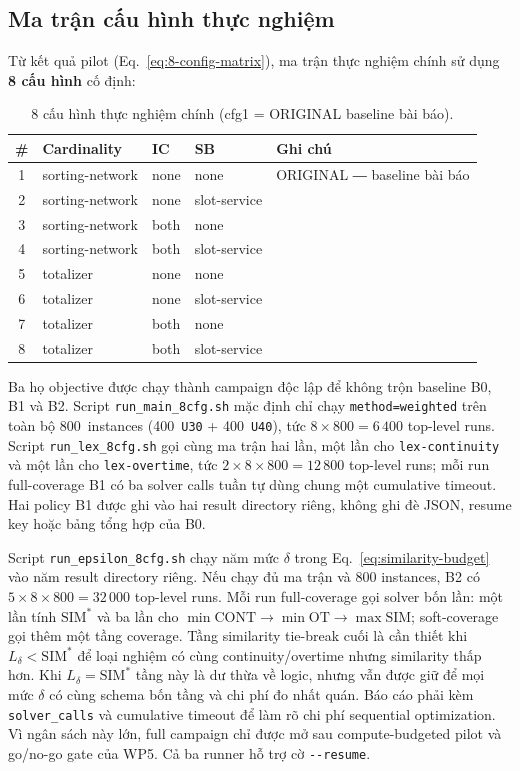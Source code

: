 \documentclass[12pt,a4paper]{article}
\newcommand{\SIM}{\mathrm{SIM}}
\newcommand{\CONT}{\mathrm{CONT}}
\newcommand{\OT}{\mathrm{OT}}
\begin{document}
\subsection{Ma trận cấu hình thực nghiệm}
\label{sec:matrix-cfg}

Từ kết quả pilot (Eq.~\ref{eq:8-config-matrix}), ma trận thực nghiệm chính
sử dụng \textbf{8 cấu hình} cố định:

\begin{table}[H]
\centering
\caption{8 cấu hình thực nghiệm chính (cfg1 = ORIGINAL baseline bài báo).}
\label{tab:8-cfg-main}
\begin{tabularx}{\textwidth}{@{}c>{\ttfamily\raggedright}p{4.2cm}>{\ttfamily}p{2.2cm}>{\ttfamily}p{3.2cm}X@{}}
\toprule
\# & Cardinality & IC & SB & Ghi chú \\
\midrule
1 & sorting-network & none & none & ORIGINAL ― baseline bài báo \\
2 & sorting-network & none & slot-service & \\
3 & sorting-network & both & none & \\
4 & sorting-network & both & slot-service & \\
5 & totalizer & none & none & \\
6 & totalizer & none & slot-service & \\
7 & totalizer & both & none & \\
8 & totalizer & both & slot-service & \\
\bottomrule
\end{tabularx}
\end{table}

Ba họ objective được chạy thành campaign độc lập để không trộn baseline B0,
B1 và B2. Script \texttt{run\_main\_8cfg.sh} mặc định chỉ chạy
\texttt{method=weighted} trên toàn bộ 800~instances
(400~\texttt{U30} + 400~\texttt{U40}), tức $8\times800=6\,400$ top-level
runs. Script \texttt{run\_lex\_8cfg.sh} gọi cùng ma trận hai lần, một lần cho
\texttt{lex-continuity} và một lần cho \texttt{lex-overtime}, tức
$2\times8\times800=12\,800$ top-level runs; mỗi run full-coverage B1 có ba
solver calls tuần tự dùng chung một cumulative timeout. Hai policy B1 được ghi
vào hai result directory riêng, không ghi đè JSON, resume key hoặc bảng tổng
hợp của B0.

Script \texttt{run\_epsilon\_8cfg.sh} chạy năm mức $\delta$ trong
Eq.~\eqref{eq:similarity-budget} vào năm result directory riêng. Nếu chạy đủ
ma trận và 800 instances, B2 có
$5\times8\times800=32\,000$ top-level runs. Mỗi run full-coverage gọi solver
bốn lần: một lần tính $\SIM^*$ và ba lần cho
$\min\CONT\rightarrow\min\OT\rightarrow\max\SIM$; soft-coverage gọi thêm một
tầng coverage. Tầng similarity tie-break cuối là cần thiết khi
$L_\delta<\SIM^*$ để loại nghiệm có cùng continuity/overtime nhưng similarity
thấp hơn. Khi $L_\delta=\SIM^*$ tầng này là dư thừa về logic, nhưng vẫn được
giữ để mọi mức $\delta$ có cùng schema bốn tầng và chi phí đo nhất quán. Báo
cáo phải kèm \texttt{solver\_calls} và cumulative timeout để làm rõ chi phí
sequential optimization. Vì ngân sách này lớn, full campaign chỉ được mở sau
compute-budgeted pilot và go/no-go gate của WP5. Cả ba runner hỗ trợ cờ
\texttt{-{}-resume}.
\end{document}
